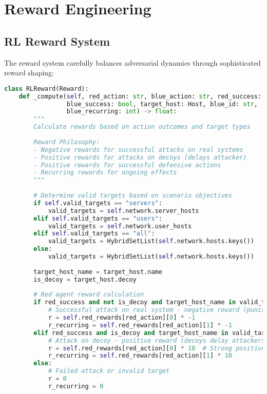 \documentclass[12pt,a4paper]{article}
\begin{document}
\section{Reward Engineering}

\subsection{RL Reward System}

The reward system carefully balances adversarial dynamics through sophisticated reward shaping:

\begin{lstlisting}[language=Python, caption=RL Reward Implementation]
class RLReward(Reward):
    def _compute(self, red_action: str, blue_action: str, red_success: bool, 
                 blue_success: bool, target_host: Host, blue_id: str, 
                 blue_recurring: int) -> float:
        """
        Calculate rewards based on action outcomes and target types
        
        Reward Philosophy:
        - Negative rewards for successful attacks on real systems
        - Positive rewards for attacks on decoys (delays attacker)
        - Positive rewards for successful defensive actions
        - Recurring rewards for ongoing effects
        """
        
        # Determine valid targets based on scenario objectives
        if self.valid_targets == "servers":
            valid_targets = self.network.server_hosts
        elif self.valid_targets == "users":
            valid_targets = self.network.user_hosts
        elif self.valid_targets == "all":
            valid_targets = HybridSetList(self.network.hosts.keys())
        else:
            valid_targets = HybridSetList(self.network.hosts.keys())
        
        target_host_name = target_host.name
        is_decoy = target_host.decoy
        
        # Red agent reward calculation
        if red_success and not is_decoy and target_host_name in valid_targets:
            # Successful attack on real system - negative reward (punishment)
            r = self.red_rewards[red_action][0] * -1
            r_recurring = self.red_rewards[red_action][1] * -1
        elif red_success and is_decoy and target_host_name in valid_targets:
            # Attack on decoy - positive reward (decoys delay attackers)
            r = self.red_rewards[red_action][0] * 10  # Strong positive signal
            r_recurring = self.red_rewards[red_action][1] * 10
        else:
            # Failed attack or invalid target
            r = 0
            r_recurring = 0
        

\end{lstlisting}
\end{document}
